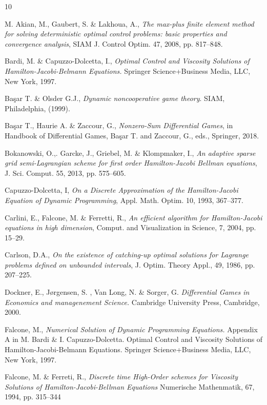 \documentclass[12pt]{article}
\begin{document}
\begin{thebibliography}{10}

 { M. Akian, M., Gaubert, S. \& Lakhoua, A.},
{\em The max-plus finite element method for solving deterministic optimal control problems: basic properties and convergence analysis}, SIAM J. Control Optim. 47, 2008, pp. 817--848.

Bardi, M. \&  Capuzzo-Dolcetta, I., {\em Optimal Control and Viscosity Solutions of Hamilton-Jacobi-Belmann Equations.}
 {Springer Science+Business Media, LLC, New York, 1997.}

 Ba\c{s}ar T. \& Olsder G.J., {\em Dynamic noncooperative game theory}. SIAM, Philadelphia, (1999).

 Ba\c{s}ar T., Haurie A. \& Zaccour, G., {\em Nonzero-Sum Differential Games}, in Handbook of Differential Games, Ba\c{s}ar T. and Zaccour, G., eds., Springer, 2018.

 { Bokanowski, O.,. Garcke, J.,   Griebel, M.  \&  Klompmaker, I.},
{\em An adaptive sparse grid semi-Lagrangian scheme for first order Hamilton-Jacobi Bellman equations}, J. Sci. Comput. 55, 2013, pp. 575--605.

 Capuzzo-Dolcetta, I, {\em  On a Discrete Approximation of the Hamilton-Jacobi Equation of Dynamic Programming}, Appl. Math. Optim. 10, 1993, 367--377.

 {Carlini, E., Falcone, M. \& Ferretti, R.},
{\em An efficient algorithm for Hamilton-Jacobi equations in high dimension}, Comput. and Visualization in Science, 7, 2004, pp. 15--29.

 {Carlson, D.A.}, {\em
On the existence of catching-up optimal solutions for Lagrange problems defined on unbounded intervals}, J. Optim. Theory Appl., 49, 1986, pp. 207–225.

 Dockner, E., J{\o}rgensen, S. , Van Long,  N. \& Sorger, G.
{\em Differential Games in Economics and managenement Science.}
 {Cambridge University Press, Cambridge, 2000.}



 Falcone, M.,
{\em Numerical Solution of Dynamic Programming Equations.}
 {Appendix A in M. Bardi \& I. Capuzzo-Dolcetta. Optimal Control and Viscosity Solutions of Hamilton-Jacobi-Belmann Equations. Springer Science+Business Media, LLC, New York, 1997.}

 Falcone, M. \&  Ferreti, R.,
{\em Discrete time High-Order schemes for Viscosity Solutions of Hamilton-Jacobi-Bellman Equations}
{Numerische Mathenmatik, 67, 1994, pp. 315--344}


\end{thebibliography}
\end{document}
